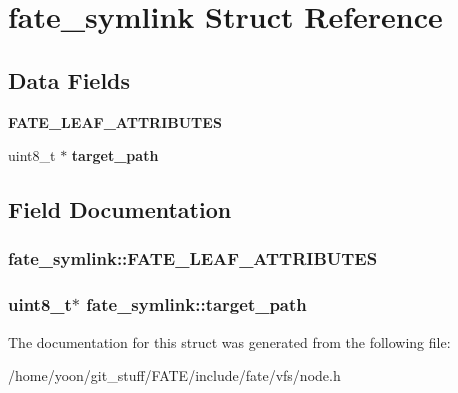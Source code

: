 \hypertarget{structfate__symlink}{\section{fate\-\_\-symlink Struct Reference}
\label{structfate__symlink}
}
\subsection*{Data Fields}
\begin{DoxyCompactItemize}
\item 
\hypertarget{structfate__symlink_ad377e60deed41f54c47b0eba686a78de}{{\bfseries F\-A\-T\-E\-\_\-\-L\-E\-A\-F\-\_\-\-A\-T\-T\-R\-I\-B\-U\-T\-E\-S}}\label{structfate__symlink_ad377e60deed41f54c47b0eba686a78de}

\item 
\hypertarget{structfate__symlink_a06c181e3b65e3375dcb536b757de5c08}{uint8\-\_\-t $\ast$ {\bfseries target\-\_\-path}}\label{structfate__symlink_a06c181e3b65e3375dcb536b757de5c08}

\end{DoxyCompactItemize}


\subsection{Field Documentation}
\hypertarget{structfate__symlink_ad377e60deed41f54c47b0eba686a78de}{
\subsubsection[{F\-A\-T\-E\-\_\-\-L\-E\-A\-F\-\_\-\-A\-T\-T\-R\-I\-B\-U\-T\-E\-S}]{\setlength{\rightskip}{0pt plus 5cm}fate\-\_\-symlink\-::\-F\-A\-T\-E\-\_\-\-L\-E\-A\-F\-\_\-\-A\-T\-T\-R\-I\-B\-U\-T\-E\-S}}\label{structfate__symlink_ad377e60deed41f54c47b0eba686a78de}
\hypertarget{structfate__symlink_a06c181e3b65e3375dcb536b757de5c08}{
\subsubsection[{target\-\_\-path}]{\setlength{\rightskip}{0pt plus 5cm}uint8\-\_\-t$\ast$ fate\-\_\-symlink\-::target\-\_\-path}}\label{structfate__symlink_a06c181e3b65e3375dcb536b757de5c08}


The documentation for this struct was generated from the following file\-:\begin{DoxyCompactItemize}
\item 
/home/yoon/git\-\_\-stuff/\-F\-A\-T\-E/include/fate/vfs/node.\-h\end{DoxyCompactItemize}
